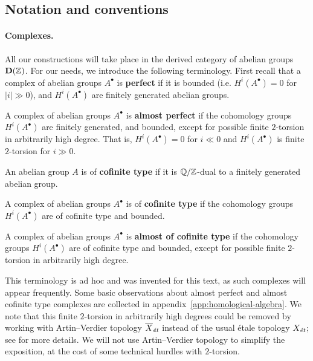\documentclass{article}
\numberwithin{equation}{section}
\begin{document}
\subsection*{Notation and conventions}

\paragraph{Complexes.}
All our constructions will take place in the derived category of abelian groups
$\mathbf{D} (\ZZ)$. For our needs, we introduce the following terminology.
First recall that a complex of abelian groups $A^\bullet$ is \textbf{perfect} if
it is bounded (i.e. $H^i (A^\bullet) = 0$ for $|i| \gg 0$), and $H^i (A^\bullet)$
are finitely generated abelian groups.

\begin{definition}
  \label{dfn:almost-of-(co)finite-type}
  A complex of abelian groups $A^\bullet$ is \textbf{almost perfect}
  if the cohomology groups $H^i (A^\bullet)$ are finitely generated, and
  bounded, except for possible finite $2$-torsion in arbitrarily high degree.
  That is, $H^i (A^\bullet) = 0$ for $i \ll 0$ and $H^i (A^\bullet)$ is finite
  $2$-torsion for $i \gg 0$.

  An abelian group $A$ is of \textbf{cofinite type} if it is $\QQ/\ZZ$-dual to
  a finitely generated abelian group.

  A complex of abelian groups $A^\bullet$ is of \textbf{cofinite type} if the
  cohomology groups $H^i (A^\bullet)$ are of cofinite type and bounded.

  A complex of abelian groups $A^\bullet$ is \textbf{almost of cofinite type}
  if the cohomology groups $H^i (A^\bullet)$ are of cofinite type and
  bounded, except for possible finite $2$-torsion in arbitrarily high
  degree.
\end{definition}

This terminology is ad hoc and was invented for this text, as such complexes
will appear frequently. Some basic observations about almost perfect and almost
cofinite type complexes are collected in
appendix~\ref{app:homological-algebra}. We note that this finite $2$-torsion
in arbitrarily high degrees could be removed by working with Artin--Verdier
topology $\overline{X}_\et$ instead of the usual étale topology $X_\et$;
see \cite[Appendix~A]{Flach-Morin-2018} for more details. We will not use
Artin--Verdier topology to simplify the exposition, at the cost of some
technical hurdles with $2$-torsion.
\end{document}

